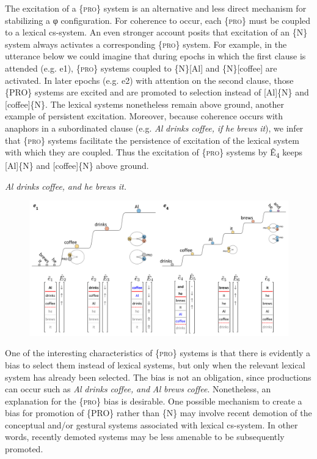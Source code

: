  The excitation of a \{\textsc{pro}\} system is an alternative and less direct mechanism for stabilizing a φ configuration. For coherence to occur, each \{\textsc{pro}\} must be coupled to a lexical cs-system. An even stronger account posits that excitation of an \{N\} system always activates a corresponding \{\textsc{pro}\} system. For example, in the utterance below we could imagine that during epochs in which the first clause is attended (e.g. e1), \{\textsc{pro}\} systems coupled to \{N\}[Al] and \{N\}[coffee] are activated. In later epochs (e.g. e2) with attention on the second clause, those \{PRO\} systems are excited and are promoted to selection instead of [Al]\{N\} and [coffee]\{N\}. The lexical systems nonetheless remain above ground, another example of persistent excitation. Moreover, because coherence occurs with anaphors in a subordinated clause (e.g. \textit{Al} \textit{drinks} \textit{coffee,} \textit{if} \textit{he} \textit{brews} \textit{it}), we infer that \{\textsc{pro}\} systems facilitate the persistence of excitation of the lexical system with which they are coupled. Thus the excitation of \{\textsc{pro}\} systems by Ê\textsubscript{4} keeps [Al]\{N\} and [coffee]\{N\} above ground.

    \textit{Al} \textit{drinks} \textit{coffee,} \textit{and} \textit{he} \textit{brews} \textit{it.}

  
\begin{figure}
\includegraphics[width=\textwidth]{figures/Tilsen-img153.png}
\caption{\missingcaption}
\label{fig:}
\end{figure}
 

  One of the interesting characteristics of \{\textsc{pro}\} systems is that there is evidently a bias to select them instead of lexical systems, but only when the relevant lexical system has already been selected. The bias is not an obligation, since productions can occur such as \textit{Al} \textit{drinks} \textit{coffee,} \textit{and} \textit{Al} \textit{brews} \textit{coffee}. Nonetheless, an explanation for the \{\textsc{pro}\} bias is desirable. One possible mechanism to create a bias for promotion of \{PRO\} rather than \{N\} may involve recent demotion of the conceptual and/or gestural systems associated with lexical cs-system. In other words, recently demoted systems may be less amenable to be subsequently promoted.

